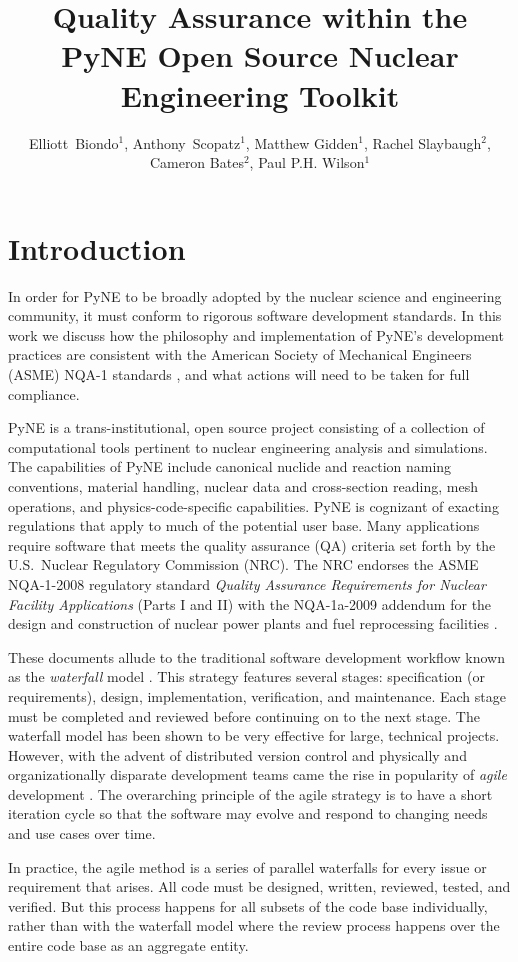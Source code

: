 \documentclass{anstrans}
\title{Quality Assurance within the PyNE Open Source Nuclear Engineering Toolkit}
\author{Elliott~Biondo$^{1}$, Anthony~Scopatz$^{1}$, Matthew Gidden$^{1}$, Rachel Slaybaugh$^{2}$, Cameron Bates$^{2}$, Paul P.H. Wilson$^{1}$}
\institute{
\and $^{1}$ The University of Wisconsin-Madison, 1415 Engineering Drive, Madison, WI 53706\\
\and $^{2}$ The University of California, Berkeley, 2521 Hearst Ave, Berkeley, CA 94709 \\
}
\begin{document}
\section{Introduction}

In order for PyNE \cite{scopatz_pyne} to be broadly adopted by the nuclear
science and engineering community, it must conform to rigorous
software development standards. In this work we discuss how the
philosophy and implementation of PyNE's development practices are consistent
with the American Society of Mechanical Engineers (ASME) NQA-1 standards
\cite{nqa}\cite{add}, and what actions will need to be taken for full
compliance.

PyNE is a trans-institutional, open source project consisting of a collection
of computational tools pertinent to nuclear engineering analysis and
simulations. The capabilities of PyNE include canonical nuclide and reaction
naming conventions, material handling, nuclear data and cross-section reading,
mesh operations, and physics-code-specific capabilities. PyNE is cognizant of
exacting regulations that apply to much of the potential user base.  Many
applications require software that meets the quality assurance (QA) criteria
set forth by the U.S.\ Nuclear Regulatory Commission (NRC). The NRC endorses
the ASME NQA-1-2008 regulatory standard \emph{Quality Assurance Requirements
for Nuclear Facility Applications} (Parts I and II) \cite{nrc} with the
NQA-1a-2009 addendum \cite{add} for the design and construction of nuclear
power plants and fuel reprocessing facilities \cite{nrc}.

These documents allude to the traditional software development workflow known as the 
\emph{waterfall} model \cite{waterfall}. This strategy features several stages:
specification (or requirements), design, implementation, verification, and maintenance. 
Each stage must be 
completed and reviewed before continuing on to the next stage. The waterfall 
model has been shown to be very effective for large, technical projects.
However, with the advent of distributed version control and physically 
and organizationally disparate development teams came the rise in popularity
of \emph{agile} development \cite{larman2004agile}. The overarching principle 
of the agile strategy is to have a short iteration cycle so that the software
may evolve and respond to changing needs and use cases over time.

In practice, the agile method is a series of parallel waterfalls for every issue
or requirement that arises. All code must be designed, written, reviewed, 
tested, and verified. But this process happens for all subsets of the code base
individually, rather than with the waterfall model where the review 
process happens over the entire code base as an aggregate entity.
\end{document}
